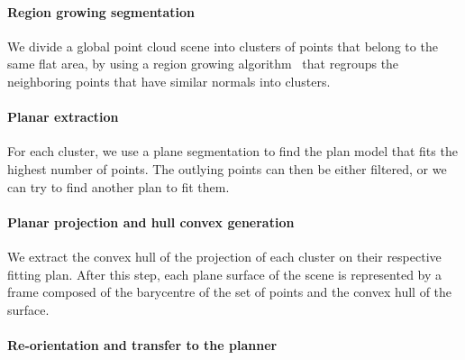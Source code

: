 \paragraph{Region growing segmentation}

We divide a global point cloud scene into clusters of points that belong to the same flat area, by using a region growing algorithm~\cite{poppinga:iros:2008} that regroups the neighboring points that have similar normals into clusters.

\paragraph{Planar extraction}

For each cluster, we use a plane segmentation to find the plan model that fits the highest number of points.
The outlying points can then be either filtered, or we can try to find another plan to fit them.

\paragraph{Planar projection and hull convex generation}

We extract the convex hull of the projection of each cluster on their respective fitting plan.
After this step, each plane surface of the scene is represented by a frame composed of the barycentre of the set of points and the convex hull of the surface.

\paragraph{Re-orientation and transfer to the planner}

